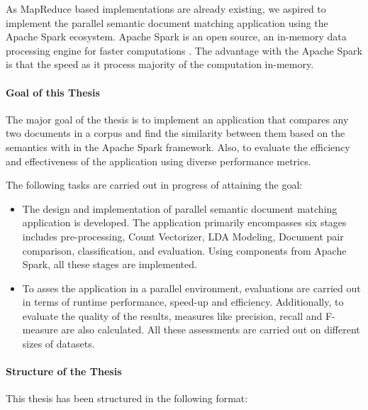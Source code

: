 \par As MapReduce based implementations are already existing, we aspired to implement the parallel semantic document matching application using the Apache Spark ecosystem. Apache Spark is an open source, an in-memory data processing engine for faster computations \cite{spark:website}. The advantage with the Apache Spark is that the speed as it process majority of the computation in-memory.

\newpage
\paragraph{Goal of this Thesis}

The major goal of the thesis is to implement an application that compares any two documents in a corpus and find the similarity between them based on the semantics with in the Apache Spark framework. Also, to evaluate the efficiency and effectiveness of the application using diverse performance metrics.

\par The following tasks are carried out in progress of attaining the goal:

\begin{itemize}
\item The design and implementation of parallel semantic document matching application is developed. The application primarily encompasses six stages includes pre-processing, Count Vectorizer, LDA Modeling, Document pair comparison, classification, and evaluation. Using components from Apache Spark, all these stages are implemented.

\item To asses the application in a parallel environment, evaluations are carried out in terms of runtime performance, speed-up and efficiency. Additionally, to evaluate the quality of the results, measures like precision, recall and F-measure are also calculated. All these assessments are carried out on different sizes of datasets. 
\end{itemize}



\paragraph{Structure of the Thesis}

This thesis has been structured in the following format:


